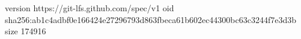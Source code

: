 version https://git-lfs.github.com/spec/v1
oid sha256:ab1c4adbf0e166424e27296793d863fbeca61b602ec44300bc63c3244f7e3d3b
size 174916

